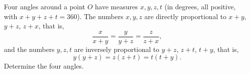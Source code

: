 Four angles around a point $O$ have measures $x,y,z,t$ (in degrees, all positive, with $x+y+z+t=360$). The numbers $x,y,z$ are directly proportional to $x+y$, $y+z$, $z+x$, that is,
\[
\dfrac{x}{x+y}=\dfrac{y}{y+z}=\dfrac{z}{z+x},
\]
and the numbers $y,z,t$ are inversely proportional to $y+z$, $z+t$, $t+y$, that is,
\[
y(y+z)=z(z+t)=t(t+y).
\]
Determine the four angles.
